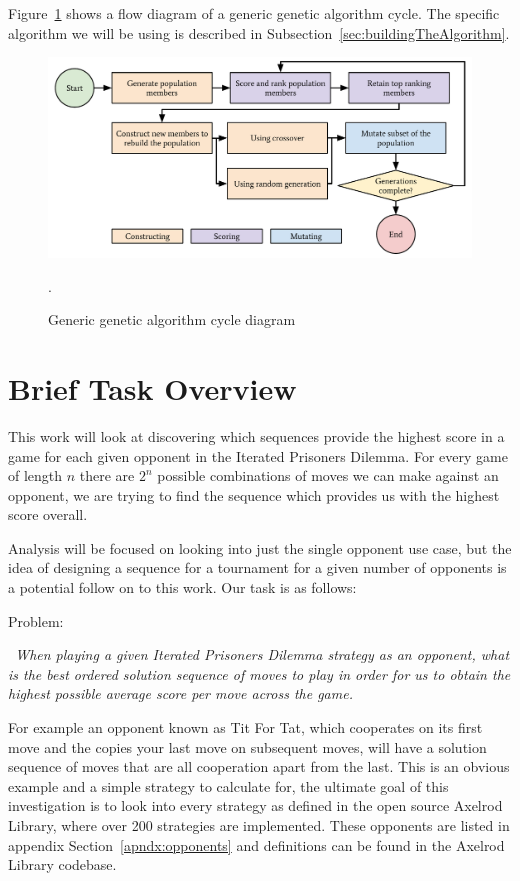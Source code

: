 Figure~\ref{fig:genericGACycle} shows a flow diagram of a generic genetic algorithm cycle.
The specific algorithm we will be using is described in Subsection~\ref{sec:buildingTheAlgorithm}.

\begin{figure}[ht]
    \centering
    \includegraphics[width=1.0\textwidth, center]{./img/flows/ga_cycle.pdf}
    \caption{Generic genetic algorithm cycle diagram}.\label{fig:genericGACycle} 
\end{figure}

\section{Brief Task Overview}\label{sec:briefOverview}
This work will look at discovering which sequences provide the highest score in a game for each given opponent in the Iterated Prisoners Dilemma.
For every game of length $n$ there are $2^n$ possible combinations of moves we can make against an opponent, we are trying to find the sequence which provides us with the highest score overall.

Analysis will be focused on looking into just the single opponent use case, but the idea of designing a sequence for a tournament for a given number of opponents is a potential follow on to this work.
Our task is as follows:

Problem:
\begin{center}
    \itshape~When playing a given Iterated Prisoners Dilemma strategy as an opponent, what is the best ordered solution sequence of moves to play in order for us to obtain the highest possible average score per move across the game.
\end{center}

For example an opponent known as Tit For Tat, which cooperates on its first move and the copies your last move on subsequent moves, will have a solution sequence of moves that are all cooperation apart from the last.
This is an obvious example and a simple strategy to calculate for, the ultimate goal of this investigation is to look into every strategy as defined in the open source Axelrod Library\cite{axelrodproject}, where over 200 strategies are implemented.
These opponents are listed in appendix Section~\ref{apndx:opponents} and definitions can be found in the Axelrod Library codebase.

